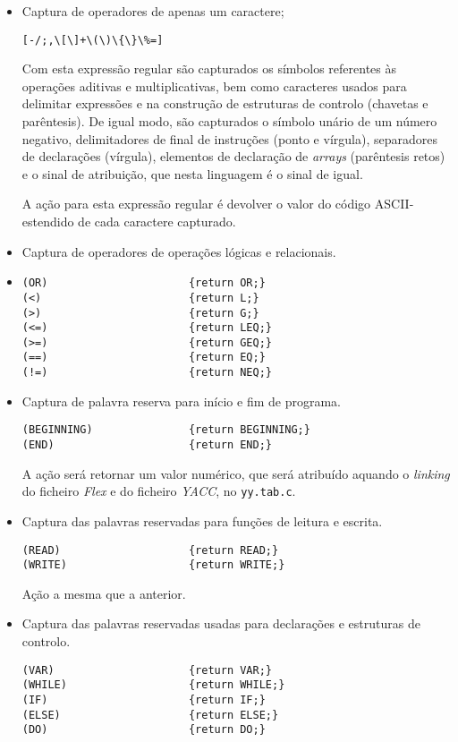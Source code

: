 \begin{itemize}
	\item Captura de operadores de apenas um caractere; 
\begin{verbatim}
[-/;,\[\]+\(\)\{\}\%=]  
\end{verbatim}

Com esta expressão regular são capturados os símbolos referentes às operações
aditivas e multiplicativas, bem como caracteres usados para delimitar expressões
e na construção de estruturas de controlo (chavetas e parêntesis). De igual
modo, são capturados o símbolo unário de um número negativo, delimitadores de
final de instruções (ponto e vírgula), separadores de declarações (vírgula), elementos de declaração
de \emph{arrays} (parêntesis retos) e o sinal de atribuição, que nesta
linguagem é o sinal de igual. 

A ação para esta expressão regular é devolver o valor do código ASCII-estendido
de cada caractere capturado.


	\item Captura de operadores de operações lógicas e relacionais.
	\item 
\begin{verbatim}
(OR)                      {return OR;}
(<)                       {return L;}
(>)                       {return G;}
(<=)                      {return LEQ;}
(>=)                      {return GEQ;}
(==)                      {return EQ;}
(!=)                      {return NEQ;}
\end{verbatim}
	\item Captura de palavra reserva para início e fim de programa. 
\begin{verbatim}
(BEGINNING)               {return BEGINNING;}
(END)                     {return END;}
\end{verbatim}

A ação será retornar um valor numérico, que será atribuído aquando
o \emph{linking} do ficheiro \emph{Flex} e do ficheiro \emph{YACC}, no
\texttt{yy.tab.c}.    

	\item Captura das palavras reservadas para funções de leitura e escrita. 
\begin{verbatim}
(READ)                    {return READ;}
(WRITE)                   {return WRITE;}
\end{verbatim}

Ação a mesma que a anterior.

	\item Captura das palavras reservadas usadas para declarações e estruturas de
		controlo.
\begin{verbatim}
(VAR)                     {return VAR;}
(WHILE)                   {return WHILE;}
(IF)                      {return IF;}
(ELSE)                    {return ELSE;}
(DO)                      {return DO;}
\end{verbatim}


\end{itemize}
